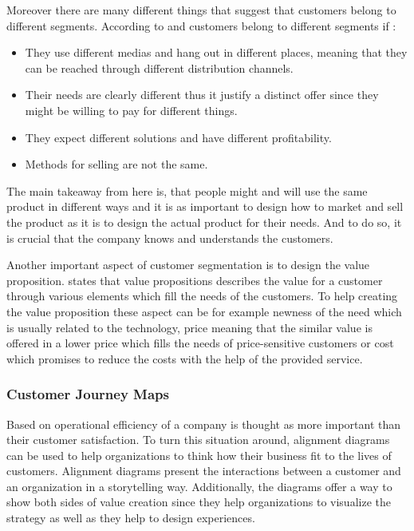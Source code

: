 Moreover there are many different things that suggest that customers belong to different segments. According to \textcite{LeanEntrepreneur:2013} and \textcite{BusinessModelGeneration:2010} customers belong to different segments if :
\begin{itemize}
\item They use different medias and hang out in different places, meaning that they can be reached through different distribution channels.
\item Their needs are clearly different thus it justify a distinct offer since they might be willing to pay for different things.
\item They expect different solutions and have different profitability.
\item Methods for selling are not the same.
\end{itemize}
The main takeaway from here is, that people might and will use the same product in different ways and it is as important to design how to market and sell the product as it is to design the actual product for their needs. And to do so, it is crucial that the company knows and understands the customers.

Another important aspect of customer segmentation is to design the value proposition. \textcite{BusinessModelGeneration:2010} states that value propositions describes the value for a customer through various elements which fill the needs of the customers. To help creating the value proposition these aspect can be for example newness of the need which is usually related to the technology, price meaning that the similar value is offered in a lower price which fills the needs of price-sensitive customers or cost which promises to reduce the costs with the help of the provided service. 

\subsubsection*{Customer Journey Maps}

Based on \textcite{Kalbach:2016} operational efficiency of a company is thought as more important than their customer satisfaction. To turn this situation around, alignment diagrams can be used to help organizations to think how their business fit to the lives of customers. Alignment diagrams present the interactions between a customer and an organization in a storytelling way. Additionally, the diagrams offer a way to show both sides of value creation since they help organizations to visualize the strategy as well as they help to design experiences. \parencite{Kalbach:2016}

